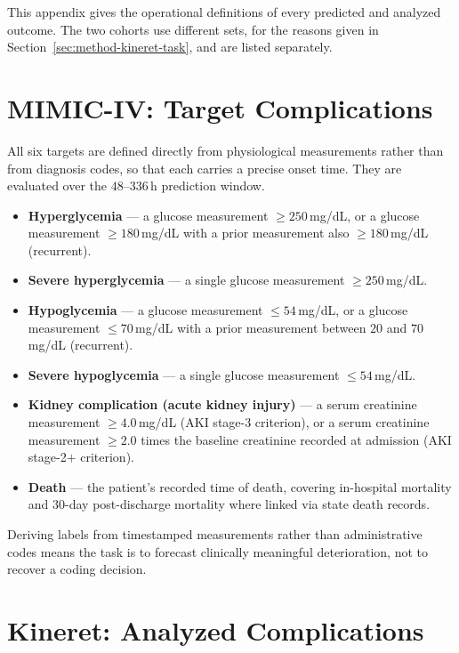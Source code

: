 This appendix gives the operational definitions of every predicted and analyzed outcome. The two cohorts use different sets, for the reasons given in Section~\ref{sec:method-kineret-task}, and are listed separately.

\section{MIMIC-IV: Target Complications}
\label{app:outcomes-mimic}

All six targets are defined directly from physiological measurements rather than from diagnosis codes, so that each carries a precise onset time. They are evaluated over the $48$--$336$\,h prediction window.

\begin{itemize}
\item \textbf{Hyperglycemia} --- a glucose measurement $\ge 250$\,mg/dL, or a glucose measurement $\ge 180$\,mg/dL with a prior measurement also $\ge 180$\,mg/dL (recurrent).
\item \textbf{Severe hyperglycemia} --- a single glucose measurement $\ge 250$\,mg/dL.
\item \textbf{Hypoglycemia} --- a glucose measurement $\le 54$\,mg/dL, or a glucose measurement $\le 70$\,mg/dL with a prior measurement between $20$ and $70$\,mg/dL (recurrent).
\item \textbf{Severe hypoglycemia} --- a single glucose measurement $\le 54$\,mg/dL.
\item \textbf{Kidney complication (acute kidney injury)} --- a serum creatinine measurement $\ge 4.0$\,mg/dL (AKI stage-3 criterion), or a serum creatinine measurement $\ge 2.0$ times the baseline creatinine recorded at admission (AKI stage-2$+$ criterion).
\item \textbf{Death} --- the patient's recorded time of death, covering in-hospital mortality and $30$-day post-discharge mortality where linked via state death records.
\end{itemize}

Deriving labels from timestamped measurements rather than administrative codes means the task is to forecast clinically meaningful deterioration, not to recover a coding decision.

\section{Kineret: Analyzed Complications}
\label{app:outcomes-kineret}

